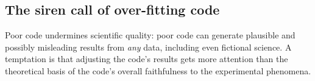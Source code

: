 \subsection{The siren call of over-fitting code}\label{over-fit}



\noindent
Poor code undermines scientific quality: poor code can generate plausible and possibly misleading results from \emph{any\/} data, including even fictional science. A temptation is that %
adjusting the code's results gets more attention than the theoretical basis of the code's overall faithfulness to the experimental phenomena. 
\def\imageWidthCalculation{\multiply \imageWidth by 21 \divide \imageWidth by 28}
\def\figureStarDetails{*}

\def\imageWidthCalculation{\multiply \imageWidth by 21 \divide \imageWidth by 28}
\def\figureStarDetails{*}

